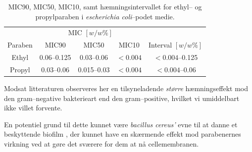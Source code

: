     \begin{table}[H]\centering
        \caption{MIC90, MIC50, MIC10, samt hæmningsintervallet for ethyl-- og propylparaben i \textit{escherichia coli}--podet medie.}
        \begin{tabular}{ccccc}
            \toprule
            & \multicolumn{3}{c}{MIC $\left[\si{w\per w \%}\right]$} & \\
            \cmidrule(r){2-4}
            Paraben & MIC90 & MIC50 & MIC10 & Interval $\left[\si{w\per w \%}\right]$ \\
            \midrule
            Ethyl & 0.06--0.125 & 0.03--0.06 & $<0.004$ & $<0.004$--0.125 \\
            Propyl & 0.03--0.06 & 0.015--0.03 & $<0.004$ & $<0.004$--0.06 \\
            \bottomrule
        \end{tabular}
    \end{table}
    Modsat litteraturen observeres her en tilsyneladende \textit{større} hæmningseffekt mod den gram--negative bakterieart end den gram--positive, hvilket vi umiddelbart ikke villet forvente. 

    En potentiel grund til dette kunnet være \textit{bacillus cereus'} evne til at danne et beskyttende biofilm \parencite{Joaq2020}, der kunnet have en skærmende effekt mod parabenernes virkning ved at gøre det sværere for dem at nå cellemembranen.

